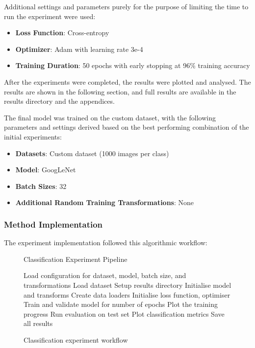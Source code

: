 \documentclass[conference]{IEEEtran}
\begin{document}
Additional settings and parameters purely for the purpose of limiting the time to run the experiment were used:

\begin{itemize}
    \item \textbf{Loss Function}: Cross-entropy
    \item \textbf{Optimizer}: Adam with learning rate 3e-4
    \item \textbf{Training Duration}: 50 epochs with early stopping at 96\% training accuracy
\end{itemize}

After the experiments were completed, the results were plotted and analysed. The results are shown in the following section, and full results are available in the results directory
and the appendices.

The final model was trained on the custom dataset, with the following parameters and settings derived based on the best performing combination of the initial experiments:

\begin{itemize}
  \item \textbf{Datasets}: Custom dataset (1000 images per class)
  \item \textbf{Model}: GoogLeNet
  \item \textbf{Batch Sizes}: 32
  \item \textbf{Additional Random Training Transformations}: None
\end{itemize}

\subsubsection{Method Implementation}

The experiment implementation followed this algorithmic workflow:

\begin{figure}[H]
\begin{algorithm}[H]
\caption{Classification Experiment Pipeline}
\begin{algorithmic}[1]
\STATE Load configuration for dataset, model, batch size, and transformations
    \STATE Load dataset
    \STATE Setup results directory
    \STATE Initialise model and transforms
    \STATE Create data loaders
    \STATE Initialise loss function, optimiser
    \STATE Train and validate model for number of epochs
    \STATE Plot the training progress
    \STATE Run evaluation on test set
    \STATE Plot classification metrics
    \STATE Save all results
\ENDFOR
\end{algorithmic}
\end{algorithm}
\caption{Classification experiment workflow}
\end{figure}
\end{document}
